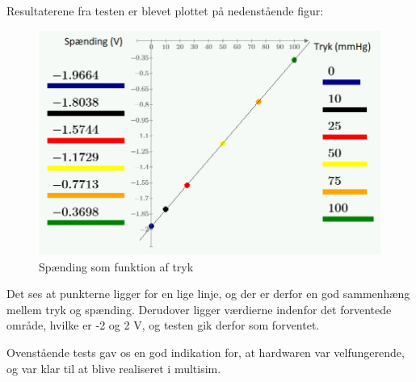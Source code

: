 Resultaterene fra testen er blevet plottet på nedenstående figur:

\begin{figure}[h!]
	\centering
	\includegraphics[width=0.8\linewidth]{../Rapport/Implementering_og_test/Hardware/integrationsplothw}
	\caption{Spænding som funktion af tryk}
	\label{fig:integrationsplot}
\end{figure}

Det ses at punkterne ligger for en lige linje, og der er derfor en god sammenhæng mellem tryk og spænding. Derudover ligger værdierne indenfor det forventede område, hvilke er -2 og 2 V, og testen gik derfor som forventet.


Ovenstående tests gav os en god indikation for, at hardwaren var velfungerende, og var klar til at blive realiseret i multisim.

\clearpage
